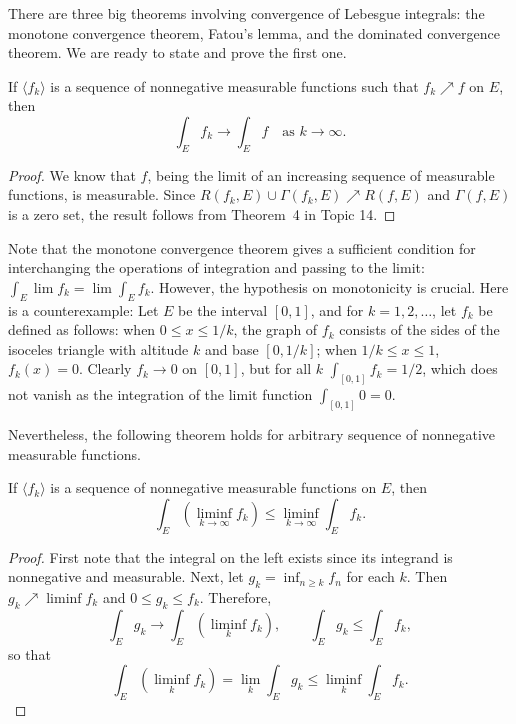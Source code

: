 \documentclass[11pt]{article}
\begin{document}
There are three big theorems involving convergence of Lebesgue integrals: the monotone convergence theorem, Fatou's lemma, and the dominated convergence theorem.  We are ready to state and prove the first one.

\begin{thm}
  If $\langle f_k \rangle$ is a sequence of nonnegative measurable functions such that $f_k \nearrow f$ on $E$, then
  \[
    \int_E f_k \to \int_E f \quad \text{as $k \to \infty$.}
  \]
\end{thm}

\begin{proof}
  We know that $f$, being the limit of an increasing sequence of measurable functions, is measurable.  Since $R(f_k, E) \cup \Gamma(f_k, E) \nearrow R(f,E)$ and $\Gamma(f,E)$ is a zero set, the result follows from Theorem~4 in Topic 14.
\end{proof}

Note that the monotone convergence theorem gives a sufficient condition for interchanging the operations of integration and passing to the limit: $\int_E \lim f_k = \lim \int_E f_k$.  However, the hypothesis on monotonicity is crucial.  Here is a counterexample:  Let $E$ be the interval $[0,1]$, and for $k = 1, 2, \dots$, let $f_k$ be defined as follows: when $0 \leqslant x \leqslant 1/k$, the graph of $f_k$ consists of the sides of the isoceles triangle with altitude $k$ and base $[0,1/k]$; when $1/k \leqslant x \leqslant 1$, $f_k(x) = 0$.  Clearly $f_k \to 0$ on $[0,1]$, but for all $k$ $\int_{[0,1]} f_k = 1/2$, which does not vanish as the integration of the limit function $\int_{[0,1]} 0 = 0$.

Nevertheless, the following theorem holds for arbitrary sequence of nonnegative measurable functions.

\begin{thm}
  \label{thm:fatou}
  If $\langle f_k \rangle$ is a sequence of nonnegative measurable functions on $E$, then
  \[
    \int_E \left( \liminf_{k \to \infty} f_k \right) \leqslant \liminf_{k \to \infty} \int_E f_k.
  \]
\end{thm}

\begin{proof}
  First note that the integral on the left exists since its integrand is nonnegative and measurable.  Next, let $g_k = \inf_{n \geqslant k} f_n$ for each $k$.  Then $g_k \nearrow \liminf f_k$ and $0 \leqslant g_k \leqslant f_k$.  Therefore,
  \[
    \int_E g_k \to \int_E \left( \liminf_k f_k \right), \qquad
    \int_E g_k \leqslant \int_E f_k,
  \]
  so that
  \[
    \int_E \left( \liminf_k f_k \right) = \lim_k \int_E g_k \leqslant \liminf_k \int_E f_k.
  \]
\end{proof}
\end{document}

